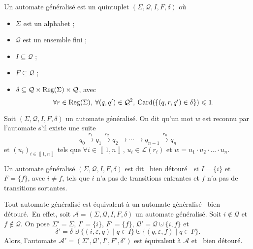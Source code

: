 \begin{defn}
	Un automate généralisé est un quintuplet $(\Sigma, \mathcal{Q}, I, F, \delta)$\/ où
	\begin{itemize}
		\item $\Sigma$\/ est un alphabet ;
		\item $\mathcal{Q}$\/ est un ensemble fini ;
		\item $I \subseteq  \mathcal{Q}$\/ ;
		\item $F \subseteq \mathcal{Q}$\/ ;
		\item $\delta \subseteq \mathcal{Q} \times \operatorname{Reg}(\Sigma) \times \mathcal{Q}$, avec \[
			\forall r \in \operatorname{Reg}(\Sigma),\:\forall (q,q') \in \mathcal{Q}^2,\:\operatorname{Card}(\{(q,r,q') \in \delta\}) \leqslant 1
		.\]
	\end{itemize}
\end{defn}

\begin{defn}
	Soit $(\Sigma, \mathcal{Q}, I, F, \delta)$\/ un automate généralisé.
	On dit qu'un mot $w$\/ est reconnu par l'automate s'il existe une suite \[
		q_0 \xrightarrow{r_1} q_1 \xrightarrow{r_2} q_2 \to \cdots \to q_{n-1}\xrightarrow{r_n} q_n
	\] et $(u_i)_{i \in \left\llbracket 1,n \right\rrbracket}$\/ tels que $\forall i \in \left\llbracket 1,n \right\rrbracket$, $u_i \in \mathcal{L}(r_i)$\/ et $w = u_1 \cdot u_2 \cdot \ldots \cdot u_n$.
\end{defn}

\begin{defn}
	Un automate généralisé $(\Sigma, \mathcal{Q}, I, F, \delta)$\/ est dit \guillemotleft~bien détouré\footnotemark~\guillemotright\ si $I = \{i\}$ et $F = \{f\}$, avec $i \neq f$, tels que $i$\/ n'a pas de transitions entrantes et $f$\/ n'a pas de transitions sortantes.
\end{defn}

\begin{lem}
	Tout automate généralisé est équivalent à un automate généralisé \guillemotleft~bien détouré.~\guillemotright\@ En effet, soit $\mathcal{A} = (\Sigma, \mathcal{Q}, I, F, \delta)$\/ un automate généralisé.
	Soit $i \not\in \mathcal{Q}$\/ et $f \not\in \mathcal{Q}$.
	On pose $\Sigma' = \Sigma$, $I' = \{i\}$, $F' = \{f\}$, $\mathcal{Q}' = \mathcal{Q} \cupdot \{i,f\}$\/ et \[
		\delta' = \delta \cupdot \{(i,\varepsilon,q)  \mid q \in I\} \cupdot \{(q,\varepsilon,f)  \mid q \in F\}
	.\] Alors, l'automate $\mathcal{A}' = (\Sigma', \mathcal{Q}', I', F', \delta')$\/ est équivalent à $\mathcal{A}$\/ et \guillemotleft~bien détouré.~\guillemotright
\end{lem}

